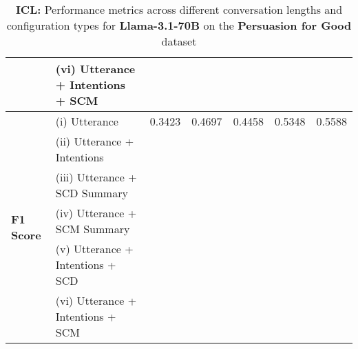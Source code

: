 \begin{table*}[ht]
\begin{tabular}{llccccc}
 & (vi) Utterance + Intentions + SCM & \cellcolor{green!25}{0.5775} & \cellcolor{green!25}{0.6620} & \cellcolor{green!25}{0.6901} & \cellcolor{green!25}{0.7887} & \cellcolor{green!25}{0.8592} \\
\midrule
\multirow{6}{*}{\textbf{F1 Score}} & (i) Utterance & 0.3423 & 0.4697 & 0.4458 & 0.5348 & 0.5588 \\
 & (ii) Utterance + Intentions & \cellcolor{green!25}{0.4463} & \cellcolor{green!25}{0.5068} & \cellcolor{red!25}{0.4181} & \cellcolor{red!25}{0.5102} & \cellcolor{red!25}{0.5446} \\
 & (iii) Utterance + SCD Summary & \cellcolor{green!25}{0.4462} & \cellcolor{green!25}{0.4932} & \cellcolor{green!25}{0.4778} & \cellcolor{red!25}{0.5274} & \cellcolor{red!25}{0.5455} \\
 & (iv) Utterance + SCM Summary & \cellcolor{green!25}{0.4000} & \cellcolor{green!25}{0.4903} & \cellcolor{green!25}{0.4783} & \cellcolor{red!25}{0.5231} & \cellcolor{red!25}{0.5534} \\
 & (v) Utterance + Intentions + SCD & \cellcolor{green!25}{0.5170} & \cellcolor{green!25}{0.5207} & \cellcolor{green!25}{0.4873} & \cellcolor{green!25}{0.5550} & \cellcolor{red!25}{0.5581} \\
 & (vi) Utterance + Intentions + SCM & \cellcolor{green!25}{0.4910} & \cellcolor{green!25}{0.5054} & \cellcolor{green!25}{0.4828} & \cellcolor{red!25}{0.5234} & \cellcolor{green!25}{0.5674} \\
\hline
\end{tabular}
\caption{\textbf{ICL: }Performance metrics across different conversation lengths and configuration types for \textbf{Llama-3.1-70B} on the \textbf{Persuasion for Good} dataset}
\label{tab:combined_metrics_icl_llama_p4g}
\end{table*}